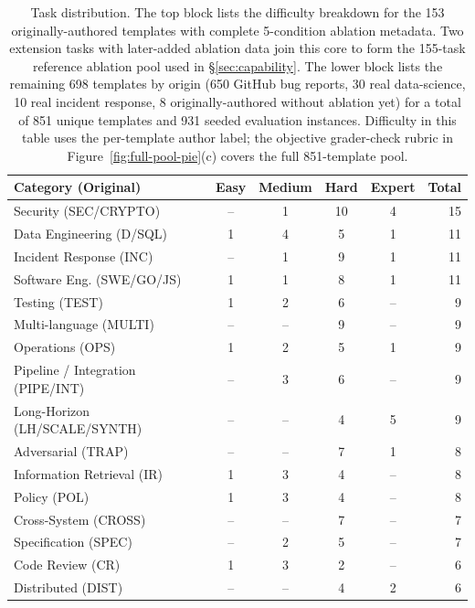 \documentclass{article}
\begin{document}
\begin{table}[t]
\centering
\caption{Task distribution. The top block lists the difficulty breakdown for the 153 originally-authored templates with complete 5-condition ablation metadata. Two extension tasks with later-added ablation data join this core to form the 155-task reference ablation pool used in \S\ref{sec:capability}. The lower block lists the remaining 698 templates by origin (650 GitHub bug reports, 30 real data-science, 10 real incident response, 8 originally-authored without ablation yet) for a total of 851 unique templates and 931 seeded evaluation instances. Difficulty in this table uses the per-template author label; the objective grader-check rubric in Figure~\ref{fig:full-pool-pie}(c) covers the full 851-template pool.}
\label{tab:distribution}
\small
\begin{tabular}{lccccr}
\toprule
Category (Original) & Easy & Medium & Hard & Expert & Total \\
\midrule
Security (SEC/CRYPTO)            & --  & 1   & 10  & 4   & 15 \\
Data Engineering (D/SQL)         & 1   & 4   & 5   & 1   & 11 \\
Incident Response (INC)          & --  & 1   & 9   & 1   & 11 \\
Software Eng. (SWE/GO/JS)        & 1   & 1   & 8   & 1   & 11 \\
Testing (TEST)                   & 1   & 2   & 6   & --  & 9 \\
Multi-language (MULTI)           & --  & --  & 9   & --  & 9 \\
Operations (OPS)                 & 1   & 2   & 5   & 1   & 9 \\
Pipeline / Integration (PIPE/INT)& --  & 3   & 6   & --  & 9 \\
Long-Horizon (LH/SCALE/SYNTH)    & --  & --  & 4   & 5   & 9 \\
Adversarial (TRAP)               & --  & --  & 7   & 1   & 8 \\
Information Retrieval (IR)       & 1   & 3   & 4   & --  & 8 \\
Policy (POL)                     & 1   & 3   & 4   & --  & 8 \\
Cross-System (CROSS)             & --  & --  & 7   & --  & 7 \\
Specification (SPEC)             & --  & 2   & 5   & --  & 7 \\
Code Review (CR)                 & 1   & 3   & 2   & --  & 6 \\
Distributed (DIST)               & --  & --  & 4   & 2   & 6 \\

\end{tabular}
\end{table}
\end{document}
